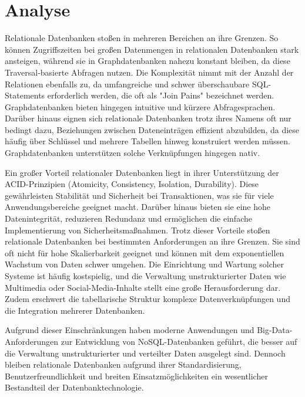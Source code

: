 \chapter{Analyse} %
\label{sec:analyse}

Relationale Datenbanken stoßen in mehreren Bereichen an ihre Grenzen. So können Zugriffszeiten bei großen Datenmengen in relationalen Datenbanken stark ansteigen, während sie in Graphdatenbanken nahezu konstant bleiben, da diese Traversal-basierte Abfragen nutzen. Die Komplexität nimmt mit der Anzahl der Relationen ebenfalls zu, da umfangreiche und schwer überschaubare SQL-Statements erforderlich werden, die oft als "Join Pains" bezeichnet werden. Graphdatenbanken bieten hingegen intuitive und kürzere Abfragesprachen. Darüber hinaus eignen sich relationale Datenbanken trotz ihres Namens oft nur bedingt dazu, Beziehungen zwischen Dateneinträgen effizient abzubilden, da diese häufig über Schlüssel und mehrere Tabellen hinweg konstruiert werden müssen. Graphdatenbanken unterstützen solche Verknüpfungen hingegen nativ.



Ein großer Vorteil relationaler Datenbanken liegt in ihrer Unterstützung der ACID-Prinzipien (Atomicity, Consistency, Isolation, Durability). Diese gewährleisten Stabilität und Sicherheit bei Transaktionen, was sie für viele Anwendungsbereiche geeignet macht. Darüber hinaus bieten sie eine hohe Datenintegrität, reduzieren Redundanz und ermöglichen die einfache Implementierung von Sicherheitsmaßnahmen. Trotz dieser Vorteile stoßen relationale Datenbanken bei bestimmten Anforderungen an ihre Grenzen. Sie sind oft nicht für hohe Skalierbarkeit geeignet und können mit dem exponentiellen Wachstum von Daten schwer umgehen. Die Einrichtung und Wartung solcher Systeme ist häufig kostspielig, und die Verwaltung unstrukturierter Daten wie Multimedia oder Social-Media-Inhalte stellt eine große Herausforderung dar. Zudem erschwert die tabellarische Struktur komplexe Datenverknüpfungen und die Integration mehrerer Datenbanken.

Aufgrund dieser Einschränkungen haben moderne Anwendungen und Big-Data-Anforderungen zur Entwicklung von NoSQL-Datenbanken geführt, die besser auf die Verwaltung unstrukturierter und verteilter Daten ausgelegt sind. Dennoch bleiben relationale Datenbanken aufgrund ihrer Standardisierung, Benutzerfreundlichkeit und breiten Einsatzmöglichkeiten ein wesentlicher Bestandteil der Datenbanktechnologie.

